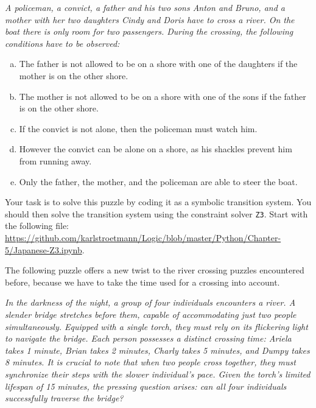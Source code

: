 \begin{minipage}{0.95\linewidth}
{\sl
  A policeman, a convict, a father and his two sons Anton and Bruno, and a mother with her two daughters Cindy and Doris have to cross a river. On the boat there is only room for two passengers.
During the crossing, the following conditions have to be observed:
\begin{enumerate}[(a)]
\item The father is not allowed to be on a shore with one of the daughters if the mother is on the other shore.
\item The mother is not allowed to be on a shore with one of the sons if the father is on the other shore.
\item If the convict is not alone, then the policeman must watch him.
\item However the convict can be alone on a shore, as his shackles prevent him from running away.
\item Only the father, the mother, and the policeman are able to steer the boat.
\end{enumerate}}
\end{minipage}

\noindent
Your task is to solve this puzzle by coding it as a symbolic transition system.  You should then solve the
transition system using the constraint solver \texttt{Z3}.
Start with the following file:
\\[0.2cm]
\hspace*{0.0cm}
\href{https://github.com/karlstroetmann/Logic/blob/master/Python/Chapter-5/Japanese-Z3.ipynb}{https://github.com/karlstroetmann/Logic/blob/master/Python/Chapter-5/Japanese-Z3.ipynb}.
\eox
\pagebreak

\exerciseEng
The following puzzle offers a new twist to the river crossing puzzles encountered before, because we have to
take the time used for a crossing into account.

\begin{minipage}{0.95\linewidth}
  {\sl
    In the darkness of the night, a group of four individuals encounters a river. A slender bridge stretches
    before them, capable of accommodating just two people simultaneously. Equipped with a single torch, they
    must rely on its flickering light to navigate the bridge. Each person possesses a distinct crossing time:
    Ariela takes 1 minute, Brian takes 2 minutes, Charly takes 5 minutes, and Dumpy takes 8 minutes. It is
    crucial to note that when two people cross together, they must synchronize their steps with the slower
    individual's pace. Given the torch's limited lifespan of 15 minutes, the pressing question arises: can all
    four individuals successfully traverse the bridge? 
  }
\end{minipage}

